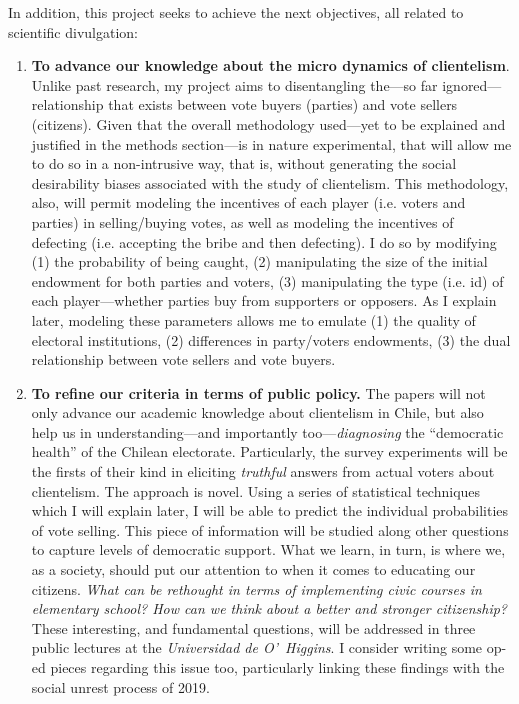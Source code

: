 \documentclass[onesided]{article}\usepackage[]{graphicx}\usepackage[]{color}
\begin{document}
In addition, this project seeks to achieve the next objectives, all related to scientific divulgation:

\begin{enumerate}
	\item {\bf To advance our knowledge about the micro dynamics of clientelism}. Unlike past research, my project aims to disentangling the---so far ignored---relationship that exists between vote buyers (parties) and vote sellers (citizens). Given that the overall methodology used---yet to be explained and justified in the methods section---is in nature experimental, that will allow me to do so in a non-intrusive way, that is, without generating the social desirability biases associated with the study of clientelism. This methodology, also, will permit modeling the incentives of each player (i.e. voters and parties) in selling/buying votes, as well as modeling the incentives of defecting (i.e. accepting the bribe and then defecting). I do so by modifying (1) the probability of being caught, (2) manipulating the size of the initial endowment for both parties and voters, (3) manipulating the type (i.e. id) of each player---whether parties buy from supporters or opposers. As I explain later, modeling these parameters allows me to emulate (1) the quality of electoral institutions, (2) differences in party/voters endowments, (3) the dual relationship between vote sellers and vote buyers.
	
	\item {\bf To refine our criteria in terms of public policy.} The papers will not only advance our academic knowledge about clientelism in Chile, but also help us in understanding---and importantly too---\emph{diagnosing} the ``democratic health'' of the Chilean electorate. Particularly, the survey experiments will be the firsts of their kind in eliciting \emph{truthful} answers from actual voters about clientelism. The approach is novel. Using a series of statistical techniques which I will explain later, I will be able to predict the individual probabilities of vote selling. This piece of information will be studied along other questions to capture levels of democratic support. What we learn, in turn, is where we, as a society, should put our attention to when it comes to educating our citizens. \emph{What can be rethought in terms of implementing civic courses in elementary school? How can we think about a better and stronger citizenship?} These interesting, and fundamental questions, will be addressed in three public lectures at the \emph{Universidad de O'\ \unskip Higgins}. I consider writing some op-ed pieces regarding this issue too, particularly linking these findings with the social unrest process of 2019.


\end{enumerate}
\end{document}

